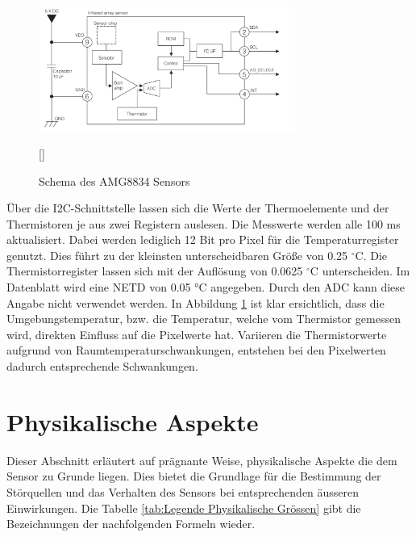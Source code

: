 \begin{figure}[H]
	\centering
	\includegraphics[width=0.75\textwidth]
	{fig/Circuit_AMG8834.PNG}
	\caption[Schema des AMG8834 Sensors]{Schema des AMG8834 Sensors} [\protect\cite{AMG8834}]
	\label{fig:SchemaAMG8834}
\end{figure}
 
Über die \ac{I2C}-Schnittstelle lassen sich die Werte der Thermoelemente und der Thermistoren je aus zwei Registern auslesen. Die Messwerte werden alle 100 ms aktualisiert. Dabei werden lediglich 12 Bit pro Pixel für die Temperaturregister genutzt. Dies führt zu der kleinsten unterscheidbaren Größe von 0.25 $^\circ$C. Die Thermistorregister lassen sich mit der Auflösung von 0.0625 $^\circ$C unterscheiden. Im Datenblatt wird eine \ac{NETD} von 0.05 °C angegeben. Durch den \ac{ADC} kann diese Angabe nicht verwendet werden.
In Abbildung \ref{fig:SchemaAMG8834} ist klar ersichtlich, dass die Umgebungstemperatur, bzw. die Temperatur, welche vom Thermistor gemessen wird, direkten Einfluss auf die Pixelwerte hat. Variieren die Thermistorwerte aufgrund von Raumtemperaturschwankungen, entstehen bei den Pixelwerten dadurch entsprechende Schwankungen.

\section{Physikalische Aspekte}
\label{sec:Physik}
Dieser Abschnitt erläutert auf prägnante Weise, physikalische Aspekte die dem Sensor zu Grunde liegen. Dies bietet die Grundlage für die Bestimmung der Störquellen und das Verhalten des Sensors bei entsprechenden äusseren Einwirkungen. Die Tabelle \ref{tab:Legende Physikalische Grössen} gibt die Bezeichnungen der nachfolgenden Formeln wieder.

